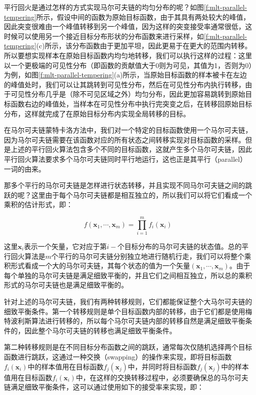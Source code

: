 平行回火是通过怎样的方式实现马尔可夫链的均匀分布的呢？如图\ref{f:mlt-parallel-tempering}所示，假设中间的函数为原始目标函数，由于其具有两处较大的峰值，因此突变很难由一个峰值转移到另一个峰值，因为这样的突变接受率通常很低，这时候可以使用另一个接近目标分布形状的分布函数来进行采样，如\ref{f:mlt-parallel-tempering}(c)所示，该分布函数由于更加平坦，因此更易于在更大的范围内转移。所以要想实现样本在原始目标函数内均匀地转移，我们可以执行这样的过程：这里以一个更极端的可见性分布（即函数的贡献值大于0则为可见，其值为1，否则为0）为例，如图\ref{f:mlt-parallel-tempering}(a)所示，当原始目标函数的样本被卡在左边的峰值处时，我们可以让其跳转到可见性分布，然后在可见性分布内执行转移，由于可见性分布几乎是（除不可见区域之外）均匀分布，因此更加容易跳转到原始目标函数右边的峰值处，当样本在可见性分布中执行完突变之后，在转移回原始目标分布，这样就完成了在原始目标分布内实现全局转移的目标。

在马尔可夫链蒙特卡洛方法中，我们对一个特定的目标函数使用一个马尔可夫链，因为马尔可夫链需要在该函数对应的所有状态之间转移实现对目标函数的采样。但是上述的平行回火算法包含多个不同的目标函数，这就产生多个马尔可夫链，因此平行回火算法要求多个马尔可夫链同时平行地运行，这也正是其平行（parallel）一词的由来。

那多个平行的马尔可夫链是怎样进行状态转移，并且实现不同马尔可夫链之间的跳跃的呢？这里由于每个马尔可夫链都是相互独立的，所以我们可以将它们看成一个乘积的估计形式，即：

\begin{equation}
	f(\mathbf{x}_1,\cdots,\mathbf{x}_m)=\prod^{m}_{i=1}f_i(\mathbf{x}_i)
\end{equation}

\noindent 这里$\mathbf{x}_i$表示一个矢量，它对应于第$i-$个目标分布的马尔可夫链的状态值。总的平行回火算法是$m$个平行的马尔可夫链分别独立地进行随机行走，我们可以将整个乘积形式看成一个大的马尔可夫链，其每个状态的值为一个矢量$(\mathbf{x}_1,\cdots,\mathbf{x}_m)$。由于每个单独的马尔可夫链是满足细致平衡的，并且它们之间相互独立，所以总的乘积形式的马尔可夫链也是满足细致平衡的。

针对上述的马尔可夫链，我们有两种转移规则，它们都能保证整个大马尔可夫链的细致平衡条件。第一个转移规则是单个目标函数内部的转移，由于它们都是使用梅特波利斯算法进行转移的，所以每个马尔可夫链内部的转移自然是满足细致平衡条件的，因此整个马尔可夫链的转移也满足细致平衡条件。

第二种转移规则是在不同目标分布函数之间的跳跃，通常每次仅随机选择两个目标函数进行跳跃，这通过一种交换（swapping）的操作来实现，即将目标函数$f_i(\mathbf{x}_i)$中的样本值用在目标函数$f_j(\mathbf{x}_j)$中，并同时将目标函数$f_j(\mathbf{x}_j)$中的样本值用在目标函数$f_i(\mathbf{x}_i)$中，在这样的交换转移过程中，必须要确保总的马尔可夫链满足细致平衡条件，这可以通过使用如下的接受率来实现，即：

